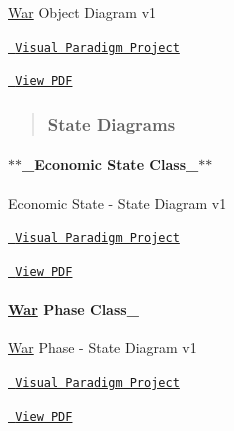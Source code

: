\mbox{\hyperlink{class_war}{War}} Object Diagram v1
\begin{DoxyItemize}
\item \href{https://drive.google.com/file/d/1a8R0VawAAuu0z4QcTBGe3MCVJl8AbWyr/view?usp=share_link}{\texttt{ Visual Paradigm Project}}~\newline

\item \href{https://drive.google.com/file/d/1Ft4f9le8D-T7N-OROjvGNc-C3R3Oe9gv/view?usp=share_link}{\texttt{ View P\+DF}}~\newline

\end{DoxyItemize}



 \begin{quote}
\subsubsection*{State Diagrams}

\end{quote}
\paragraph*{$\ast$$\ast$\+\_\+\+Economic State Class\+\_\+$\ast$$\ast$  ~\newline
}

Economic State -\/ State Diagram v1
\begin{DoxyItemize}
\item \href{https://drive.google.com/file/d/1aA4bAcO0tm01cu5uwLOfeAOd_xMYy9i9/view?usp=sharing}{\texttt{ Visual Paradigm Project}}~\newline

\item \href{https://drive.google.com/file/d/1xTZKwClYsL8jPc1O_nPhbfOkmSWi83qQ/view?usp=share_link}{\texttt{ View P\+DF}}~\newline

\end{DoxyItemize}

\paragraph*{{\bfseries{\mbox{\hyperlink{class_war}{War}} Phase Class\+\_\+}}  ~\newline
}

\mbox{\hyperlink{class_war}{War}} Phase -\/ State Diagram v1
\begin{DoxyItemize}
\item \href{https://drive.google.com/file/d/148be-O9nPzwdszQ_UXCoqMjY5EGEokeh/view?usp=sharing}{\texttt{ Visual Paradigm Project}}~\newline

\item \href{https://drive.google.com/file/d/1Uf97D890KJebWaE-gndhM2UmzPNAZ_vJ/view?usp=share_link}{\texttt{ View P\+DF}}~\newline

\end{DoxyItemize}



